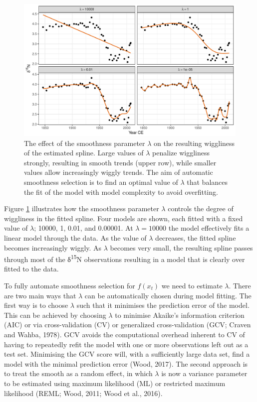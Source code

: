 \documentclass[12pt,]{article}
\begin{document}
\begin{figure}

{\centering \includegraphics[width=0.8\linewidth]{manuscript_files/figure-latex/penalty-example-plot-1} 

}

\caption{The effect of the smoothness parameter $\lambda$ on the resulting wiggliness of the estimated spline. Large values of $\lambda$ penalize wiggliness strongly, resulting in smooth trends (upper row), while smaller values allow increasingly wiggly trends. The aim of automatic smoothness selection is to find an optimal value of $\lambda$ that balances the fit of the model with model complexity to avoid overfitting.}\label{fig:penalty-example-plot}
\end{figure}

Figure \ref{fig:penalty-example-plot} illustrates how the smoothness
parameter \(\lambda\) controls the degree of wiggliness in the fitted
spline. Four models are shown, each fitted with a fixed value of
\(\lambda\); 10000, 1, 0.01, and 0.00001. At \(\lambda = 10000\) the
model effectively fits a linear model through the data. As the value of
\(\lambda\) decreases, the fitted spline becomes increasingly wiggly. As
\(\lambda\) becomes very small, the resulting spline passes through most
of the δ\textsuperscript{15}N observations resulting in a model that is
clearly over fitted to the data.

To fully automate smoothness selection for \(f(x_t)\) we need to
estimate \(\lambda\). There are two main ways that \(\lambda\) can be
automatically chosen during model fitting. The first way is to choose
\(\lambda\) such that it minimises the prediction error of the model.
This can be achieved by choosing \(\lambda\) to minimise Akaike's
information criterion (AIC) or via cross-validation (CV) or generalized
cross-validation (GCV; Craven and Wahba, 1978). GCV avoids the
computational overhead inherent to CV of having to repeatedly refit the
model with one or more observations left out as a test set. Minimising
the GCV score will, with a sufficiently large data set, find a model
with the minimal prediction error (Wood, 2017). The second approach is
to treat the smooth as a random effect, in which \(\lambda\) is now a
variance parameter to be estimated using maximum likelihood (ML) or
restricted maximum likelihood (REML; Wood, 2011; Wood et al., 2016).
\end{document}
